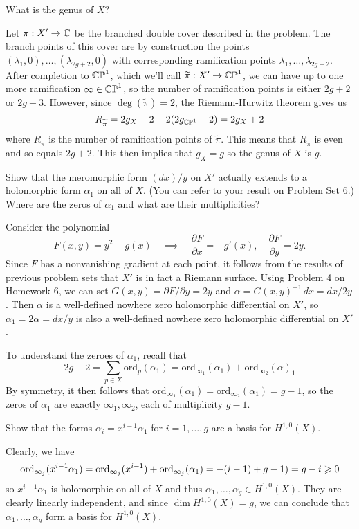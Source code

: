 \documentclass[expanded]{lkx_pset}
\begin{document}
\begin{parts}
	\begin{part}{}
		What is the genus of $X$?
	\end{part}

	Let $\pi : X' \to \mathbb{C}$ be the branched double cover described in the problem. The branch points of this cover are by construction the points $(\lambda_1, 0),\ldots, (\lambda_{2g+2},0)$ with corresponding ramification points $\lambda_1,\ldots,\lambda_{2g+2}$. After completion to $\mathbb{CP}^1$, which we'll call $\widetilde{\pi} : X' \to \mathbb{CP}^1$, we can have up to one more ramification $\infty\in\mathbb{CP}^1$, so the number of ramification points is either $2g+2$ or $2g+3$. However, since $\deg(\widetilde{\pi})=2$, the Riemann-Hurwitz theorem gives us
	\[
		R_{\widetilde{\pi}} = 2g_X - 2 - 2(2g_{\mathbb{CP}^1} - 2) = 2g_X +2
	\]
	where $R_{\widetilde{\pi}}$ is the number of ramification points of $\widetilde{\pi}$. This means that $R_{\widetilde{\pi}}$ is even and so equals $2g+2$. This then implies that $g_X=g$ so the genus of $X$ is $g$.

	\begin{part}{}
		Show that the meromorphic form $(dx)/y$ on $X'$ actually extends to a holomorphic form $\alpha_{1}$ on all of $X$. (You can refer to your result on Problem Set 6.) Where are the zeros of $\alpha_{1}$ and what are their multiplicities?\medskip
	\end{part}

	Consider the polynomial
	\[
		F(x,y) = y^2 - g(x) \quad\implies\quad \frac{\partial F}{\partial x} = -g'(x),\quad \frac{\partial F}{\partial y} = 2y.
	\]
	Since $F$ has a nonvanishing gradient at each point, it follows from the results of previous problem sets that $X'$ is in fact a Riemann surface. Using Problem 4 on Homework 6, we can set $G(x,y)=\partial F/\partial y = 2y$ and $\alpha = G(x,y)^{-1}\,dx = dx/2y$. Then $\alpha$ is a well-defined nowhere zero holomorphic differential on $X'$, so $\alpha_1=2\alpha = dx/y$ is also a well-defined nowhere zero holomorphic differential on $X'$.

	To understand the zeroes of $\alpha_1$, recall that
	\[
		2g-2 = \sum_{p\in X}\textrm{ord}_p(\alpha_1)=\textrm{ord}_{\infty_1}(\alpha_1) + \textrm{ord}_{\infty_2}(\alpha)_1
	\]
	By symmetry, it then follows that $\textrm{ord}_{\infty_1}(\alpha_1) = \textrm{ord}_{\infty_2}(\alpha_1) = g-1$, so the zeros of $\alpha_1$ are exactly $\infty_1,\infty_2$, each of multiplicity $g-1$.

	\begin{part}{}
		Show that the forms $\alpha_{i} = x^{i-1}\alpha_{1}$ for $i=1,\dots, g$ are a basis for $H^{1,0}(X)$.
	\end{part}
	Clearly, we have
	\[
		\textrm{ord}_{\infty_j}(x^{i-1}\alpha_1) = \mathrm{ord}_{\infty_j}(x^{i-1}) + \textrm{ord}_{\infty_j}(\alpha_1) = -(i-1)+g-1) = g-i\geqslant 0
	\]
	so $x^{i-1}\alpha_1$ is holomorphic on all of $X$ and thus $\alpha_1,\ldots, \alpha_g\in H^{1,0}(X)$. They are clearly linearly independent, and since $\dim H^{1,0}(X)=g$, we can conclude that $\alpha_1,\ldots, \alpha_g$ form a basis for $H^{1,0}(X)$.
\end{parts}
\end{document}
